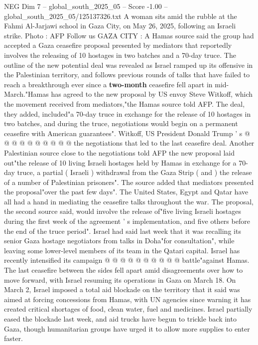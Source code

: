 \begin{textsample}{NEG Dim 7 – global\_south\_2025\_05 – Score -1.00 – global\_south\_2025\_05/125137326.txt}  \label{ex:f7_neg_018}
A woman sits amid the rubble at the Fahmi Al-Jarjawi school in Gaza City, on May 26, 2025, following an Israeli strike.
Photo : AFP Follow us GAZA CITY : A Hamas source said the group had accepted a Gaza ceasefire proposal presented by mediators that reportedly involves the releasing of 10 hostages in two batches and a 70-day truce.
The outline of the new potential deal was revealed as Israel ramped up its offensive in the Palestinian territory, and follows previous rounds of talks that have failed to reach a breakthrough ever since a \textbf{two-month} ceasefire fell apart in mid-March."Hamas has agreed to the new proposal by US envoy Steve Witkoff, which the movement received from mediators,"the Hamas source told AFP.
The deal, they added, included"a 70-day truce in exchange for the release of 10 hostages in two batches, and during the truce, negotiations would begin on a permanent ceasefire with American guarantees".
Witkoff, US President Donald Trump ' s @ @ @ @ @ @ @ @ @ @ the negotiations that led to the last ceasefire deal.
Another Palestinian source close to the negotiations told AFP the new proposal laid out"the release of 10 living Israeli hostages held by Hamas in exchange for a 70-day truce, a partial ( Israeli ) withdrawal from the Gaza Strip ( and ) the release of a number of Palestinian prisoners".
The source added that mediators presented the proposal"over the past few days".
The United States, Egypt and Qatar have all had a hand in mediating the ceasefire talks throughout the war.
The proposal, the second source said, would involve the release of"five living Israeli hostages during the first week of the agreement ' s implementation, and five others before the end of the truce period".
Israel had said last week that it was recalling its senior Gaza hostage negotiators from talks in Doha"for consultation", while leaving some lower-level members of its team in the Qatari capital.
Israel has recently intensified its campaign @ @ @ @ @ @ @ @ @ @ battle"against Hamas.
The last ceasefire between the sides fell apart amid disagreements over how to move forward, with Israel resuming its operations in Gaza on March 18.
On March 2, Israel imposed a total aid blockade on the territory that it said was aimed at forcing concessions from Hamas, with UN agencies since warning it has created critical shortages of food, clean water, fuel and medicines.
Israel partially eased the blockade last week, and aid trucks have begun to trickle back into Gaza, though humanitarian groups have urged it to allow more supplies to enter faster.

\end{textsample}
